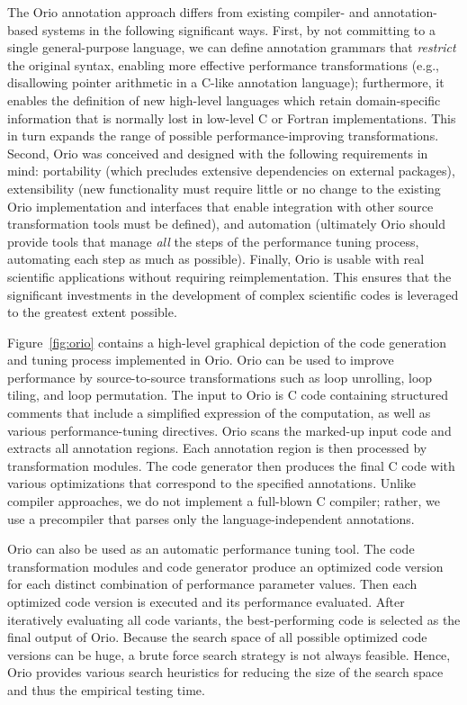 The Orio annotation approach differs from existing compiler- and
annotation-based systems in the following significant ways.
%
First, by not committing to a single general-purpose language, we can define 
annotation grammars that \emph{restrict} the original syntax, enabling more
effective performance transformations (e.g., disallowing pointer arithmetic
in a C-like annotation language); furthermore, it enables the definition of
new high-level languages which retain domain-specific
information that is normally lost in low-level C or Fortran
implementations. This in turn expands the range of possible performance-improving 
transformations.
%
Second, Orio was conceived and designed with the following requirements in mind: 
portability (which precludes extensive dependencies on external packages),
extensibility (new functionality must require little or no change to the
existing Orio implementation and interfaces that enable integration with
other source transformation tools must be defined), and automation
(ultimately Orio should provide tools that manage
\emph{all} the steps of the performance tuning process, automating each step 
as much as possible).
%
Finally, Orio is usable with real scientific applications without
requiring reimplementation. This ensures that the significant investments in
the development of complex scientific codes is leveraged to the greatest
extent possible.

Figure~\ref{fig:orio} contains a high-level graphical depiction of the code
generation and tuning process implemented in Orio.  Orio can be used to
improve performance by source-to-source transformations such as loop
unrolling, loop tiling, and loop permutation. The input to Orio is C code
containing structured comments that include a simplified expression of the
computation, as well as various performance-tuning directives. Orio scans the
marked-up input code and extracts all annotation regions. Each annotation
region is then processed by transformation modules. The code generator then
produces the final C code with various optimizations that correspond to the
specified annotations. Unlike compiler approaches, we do not implement a
full-blown C compiler; rather, we use a precompiler that parses only the
language-independent annotations.

Orio can also be used as an automatic performance tuning tool.  The code
transformation modules and code generator produce an optimized code version
for each distinct combination of performance parameter values. Then each
optimized code version is executed and its performance evaluated.  After
iteratively evaluating all code variants, the best-performing code is selected
as the final output of Orio. Because the search space of all possible
optimized code versions can be huge, a brute force search strategy is not
always feasible. Hence, Orio provides various search heuristics for reducing
the size of the search space and thus the empirical testing time.

